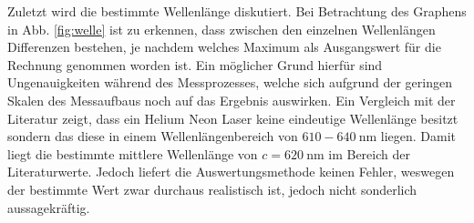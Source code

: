 Zuletzt wird die bestimmte Wellenlänge diskutiert.
Bei Betrachtung des Graphens in Abb. \ref{fig:welle} ist zu erkennen, dass zwischen den einzelnen Wellenlängen Differenzen bestehen, je nachdem welches Maximum als Ausgangswert für die Rechnung genommen worden ist. Ein möglicher Grund hierfür sind Ungenauigkeiten während des Messprozesses, welche sich aufgrund der geringen Skalen des Messaufbaus noch auf das Ergebnis auswirken. Ein Vergleich mit der Literatur \cite{VHeNeGoettingen} zeigt, dass ein Helium Neon Laser keine eindeutige Wellenlänge besitzt sondern das diese in einem Wellenlängenbereich von $610-\SI{640}{\nano\meter}$ liegen. Damit liegt die bestimmte mittlere Wellenlänge von $c = \SI{620}{\nano\meter}$ im Bereich der Literaturwerte. Jedoch liefert die Auswertungsmethode keinen Fehler, weswegen der bestimmte Wert zwar durchaus realistisch ist, jedoch nicht sonderlich aussagekräftig.  